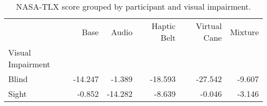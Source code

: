 
\begin{table}[!htb]
\centering
\caption{NASA-TLX score grouped by participant and visual impairment.}
\label{tab:nasa_average_group}
\begin{tabular}{lrrrrr}
\toprule
{} &    Base &   Audio &  Haptic Belt &  Virtual Cane &  Mixture \\
Visual Impairment &         &         &              &               &          \\
\midrule
Blind             & -14.247 &  -1.389 &      -18.593 &       -27.542 &   -9.607 \\
Sight             &  -0.852 & -14.282 &       -8.639 &        -0.046 &   -3.146 \\
\bottomrule
\end{tabular}
\end{table}

